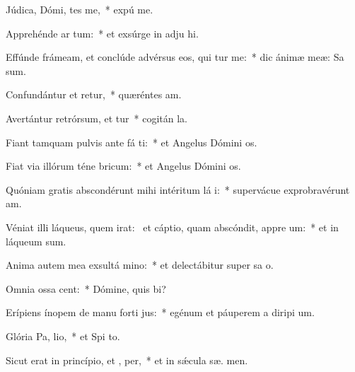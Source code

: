 \item Júdica, Dómi, tes me,~* expú  me.
\item Apprehénde ar  tum:~* et exsúrge in adju hi.
\item Effúnde frámeam, et conclúde advérsus eos, qui tur me:~* dic ánimæ meæ: Sa   sum.
\item Confundántur et retur,~* quæréntes  am.
\item Avertántur retrórsum, et tur~* cogitán  la.
\item Fiant tamquam pulvis ante fá ti:~* et Angelus Dómini  os.
\item Fiat via illórum téne  bricum:~* et Angelus Dómini  os.
\item Quóniam gratis abscondérunt mihi intéritum lá i:~* supervácue exprobravérunt  am.
\item Véniat illi láqueus, quem irat:~\pscross{} et cáptio, quam abscóndit, appre um:~* et in láqueum   sum.
\item Anima autem mea exsultá  mino:~* et delectábitur super sa o.
\item Omnia ossa  cent:~* Dómine, quis  bi?
\item Erípiens ínopem de manu forti jus:~* egénum et páuperem a diripi um.
\item Glória Pa,  lio,~* et Spi to.
\item Sicut erat in princípio, et ,  per,~* et in sǽcula sæ. men.
